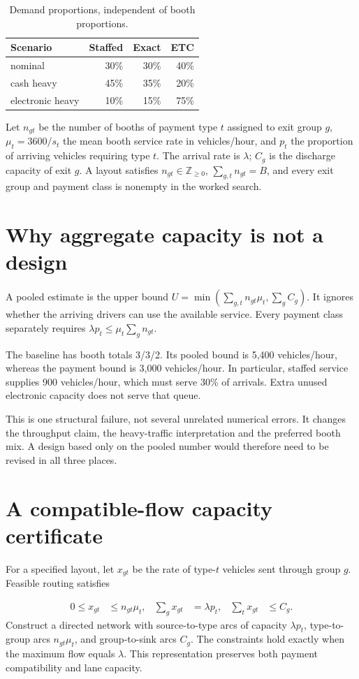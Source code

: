 \documentclass[12pt,letterpaper]{article}
\begin{document}
\begin{table}[H]\centering\small\caption{Demand proportions, independent of booth proportions.}\begin{tabular}{@{}lrrr@{}}\toprule
Scenario & Staffed & Exact & ETC\\\midrule
nominal & 30\% & 30\% & 40\%\\
cash heavy & 45\% & 35\% & 20\%\\
electronic heavy & 10\% & 15\% & 75\%\\
\bottomrule\end{tabular}\end{table}
Let $n_{gt}$ be the number of booths of payment type $t$ assigned to exit group $g$, $\mu_t=3600/s_t$ the mean booth service rate in vehicles/hour, and $p_t$ the proportion of arriving vehicles requiring type $t$. The arrival rate is $\lambda$; $C_g$ is the discharge capacity of exit $g$. A layout satisfies $n_{gt}\in\mathbb Z_{\ge0}$, $\sum_{g,t}n_{gt}=B$, and every exit group and payment class is nonempty in the worked search.

\section{Why aggregate capacity is not a design}
A pooled estimate is the upper bound $U=\min(\sum_{g,t}n_{gt}\mu_t,\sum_g C_g)$. It ignores whether the arriving drivers can use the available service. Every payment class separately requires $\lambda p_t\le\mu_t\sum_g n_{gt}$.

The baseline has booth totals 3/3/2. Its pooled bound is 5,400 vehicles/hour, whereas the payment bound is 3,000 vehicles/hour. In particular, staffed service supplies 900 vehicles/hour, which must serve 30\% of arrivals. Extra unused electronic capacity does not serve that queue.

This is one structural failure, not several unrelated numerical errors. It changes the throughput claim, the heavy-traffic interpretation and the preferred booth mix. A design based only on the pooled number would therefore need to be revised in all three places.

\section{A compatible-flow capacity certificate}
For a specified layout, let $x_{gt}$ be the rate of type-$t$ vehicles sent through group $g$. Feasible routing satisfies

\begin{align}
0\le x_{gt}&\le n_{gt}\mu_t, &\sum_g x_{gt}&=\lambda p_t, &\sum_t x_{gt}&\le C_g. \label{eq:flow}
\end{align}
Construct a directed network with source-to-type arcs of capacity $\lambda p_t$, type-to-group arcs $n_{gt}\mu_t$, and group-to-sink arcs $C_g$. The constraints hold exactly when the maximum flow equals $\lambda$. This representation preserves both payment compatibility and lane capacity.
\end{document}
